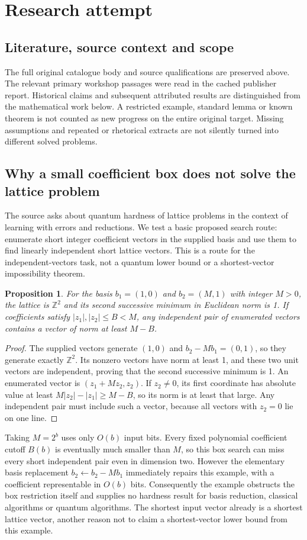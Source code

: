 \documentclass[11pt]{article}
\newtheorem{proposition}{Proposition}
\begin{document}
\section{Research attempt}
\subsection{Literature, source context and scope}
The full original catalogue body and source qualifications are preserved above. The relevant primary workshop passages were read in the cached publisher report. Historical claims and subsequent attributed results are distinguished from the mathematical work below. A restricted example, standard lemma or known theorem is not counted as new progress on the entire original target. Missing assumptions and repeated or rhetorical extracts are not silently turned into different solved problems.

\subsection{Why a small coefficient box does not solve the lattice problem}
The source asks about quantum hardness of lattice problems in the context of learning with errors and reductions. We test a basic proposed search route: enumerate short integer coefficient vectors in the supplied basis and use them to find linearly independent short lattice vectors. This is a route for the independent-vectors task, not a quantum lower bound or a shortest-vector impossibility theorem.
\begin{proposition}
For the basis $b_1=(1,0)$ and $b_2=(M,1)$ with integer $M>0$, the lattice is $\mathbb Z^2$ and its second successive minimum in Euclidean norm is 1. If coefficients satisfy $|z_1|,|z_2|\le B<M$, any independent pair of enumerated vectors contains a vector of norm at least $M-B$.
\end{proposition}
\begin{proof}
The supplied vectors generate $(1,0)$ and $b_2-Mb_1=(0,1)$, so they generate exactly $\mathbb Z^2$. Its nonzero vectors have norm at least 1, and these two unit vectors are independent, proving that the second successive minimum is 1. An enumerated vector is $(z_1+Mz_2,z_2)$. If $z_2\ne0$, its first coordinate has absolute value at least $M|z_2|-|z_1|\ge M-B$, so its norm is at least that large. Any independent pair must include such a vector, because all vectors with $z_2=0$ lie on one line.
\end{proof}
Taking $M=2^b$ uses only $O(b)$ input bits. Every fixed polynomial coefficient cutoff $B(b)$ is eventually much smaller than $M$, so this box search can miss every short independent pair even in dimension two. However the elementary basis replacement $b_2\leftarrow b_2-Mb_1$ immediately repairs this example, with a coefficient representable in $O(b)$ bits. Consequently the example obstructs the box restriction itself and supplies no hardness result for basis reduction, classical algorithms or quantum algorithms. The shortest input vector already is a shortest lattice vector, another reason not to claim a shortest-vector lower bound from this example.
\end{document}
